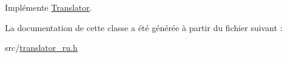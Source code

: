 Implémente \hyperlink{class_translator_a31e719b4e290a359ddbb78132bf3f494}{Translator}.



La documentation de cette classe a été générée à partir du fichier suivant \+:\begin{DoxyCompactItemize}
\item 
src/\hyperlink{translator__ru_8h}{translator\+\_\+ru.\+h}\end{DoxyCompactItemize}
